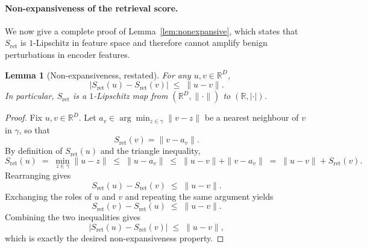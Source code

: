\documentclass{article}
\theoremstyle{plain}
\newtheorem{lemma}[theorem]{Lemma}
\theoremstyle{definition}
\theoremstyle{remark}
\begin{document}
\paragraph{Non-expansiveness of the retrieval score.}
We now give a complete proof of Lemma~\ref{lem:nonexpansive}, which
states that $S_{\mathrm{ret}}$ is $1$-Lipschitz in feature space and
therefore cannot amplify benign perturbations in encoder features.

\begin{lemma}[Non-expansiveness, restated]
For any $u,v \in \mathbb{R}^D$,
\begin{equation}
    \big|S_{\mathrm{ret}}(u) - S_{\mathrm{ret}}(v)\big|
    \;\le\; \|u - v\|.
\end{equation}
In particular, $S_{\mathrm{ret}}$ is a $1$-Lipschitz map from
$(\mathbb{R}^D,\|\cdot\|)$ to $(\mathbb{R},|\cdot|)$.
\end{lemma}

\begin{proof}
Fix $u,v\in\mathbb{R}^D$. Let
$a_v \in \arg\min_{z\in\gamma} \|v-z\|$ be a nearest neighbour of
$v$ in $\gamma$, so that
\begin{equation}
    S_{\mathrm{ret}}(v) = \|v - a_v\|.
\end{equation}
By definition of $S_{\mathrm{ret}}(u)$ and the triangle inequality,
\begin{equation}
    S_{\mathrm{ret}}(u)
    \;=\; \min_{z\in\gamma} \|u-z\|
    \;\le\; \|u - a_v\|
    \;\le\; \|u-v\| + \|v - a_v\|
    \;=\; \|u-v\| + S_{\mathrm{ret}}(v).
\end{equation}
Rearranging gives
\begin{equation}
    S_{\mathrm{ret}}(u) - S_{\mathrm{ret}}(v)
    \;\le\; \|u-v\|.
\end{equation}
Exchanging the roles of $u$ and $v$ and repeating the same argument
yields
\begin{equation}
    S_{\mathrm{ret}}(v) - S_{\mathrm{ret}}(u)
    \;\le\; \|u-v\|.
\end{equation}
Combining the two inequalities gives
\begin{equation}
    |S_{\mathrm{ret}}(u) - S_{\mathrm{ret}}(v)|
    \;\le\; \|u-v\|,
\end{equation}
which is exactly the desired non-expansiveness property.
\end{proof}
\end{document}
